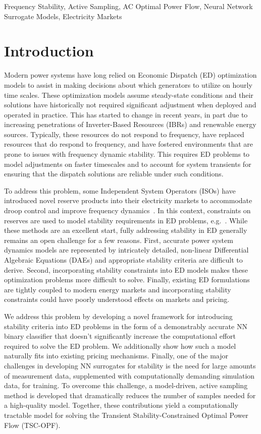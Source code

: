 \documentclass[lettersize,journal]{IEEEtran}
\begin{document}
\begin{IEEEkeywords}
Frequency Stability, Active Sampling, AC Optimal Power Flow, Neural Network Surrogate Models, Electricity Markets
\end{IEEEkeywords}

\section{Introduction}

Modern power systems have long relied on Economic Dispatch (ED) optimization models to assist in making decisions about which generators to utilize on hourly time scales. These optimization models assume steady-state conditions and their solutions have historically not required significant adjustment when deployed and operated in practice.  This has started to change in recent years, in part due to increasing penetrations of Inverter-Based Resources (IBRs) and renewable energy sources. Typically, these resources do not respond to frequency, have replaced resources that do respond to frequency, and have fostered environments that are prone to issues with frequency dynamic stability.  This requires ED problems to model adjustments on faster timescales and to account for system transients for ensuring that the dispatch solutions are reliable under such conditions. 

To address this problem, some Independent System Operators (ISOs) have introduced novel reserve products into their electricity markets to accommodate droop control and improve frequency dynamics~\cite{mago2020new,operator2017fast,meng2019fast}.  In this context, constraints on reserves are used to model stability requirements in ED problems, e.g.~\cite{li2018design,liu2018participation}. While these methods are an excellent start, fully addressing stability in ED generally remains an open challenge for a few reasons.  First, accurate power system dynamics models are represented by intricately detailed, non-linear Differential Algebraic Equations (DAEs) and appropriate stability criteria are difficult to derive.  Second, incorporating stability constraints into ED models makes these optimization problems more difficult to solve.  Finally, existing ED formulations are tightly coupled to modern energy markets and incorporating stability constraints could have poorly understood effects on markets and pricing. 

We address this problem by developing a novel framework for introducing stability criteria into ED problems in the form of a demonstrably accurate NN binary classifier that doesn't significantly increase the computational effort required to solve the ED problem.   We additionally show how such a model naturally fits into existing pricing mechanisms. Finally, one of the major challenges in developing NN surrogates for stability is the need for large amounts of measurement data, supplemented with computationally demanding simulation data, for training. To overcome this challenge, a model-driven, active sampling method is developed that dramatically reduces the number of samples needed for a high-quality model. Together, these contributions yield a computationally tractable model for solving the Transient Stability-Constrained Optimal Power Flow (TSC-OPF). 
\end{document}
